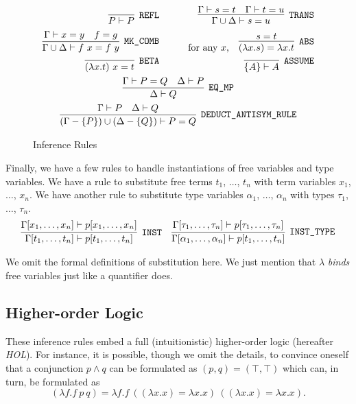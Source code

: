 \begin{figure}
  \begin{gather*}
    \begin{aligned}
      \infer[\code{REFL}]{P\vdash P}{} &\qquad&
      \infer[\code{TRANS}]{\Gamma\cup\Delta\vdash s=u}{\Gamma\vdash s=t&\Gamma\vdash t=u}\\
      \infer[\code{MK\_COMB}]{\Gamma\cup\Delta\vdash f\ x=f\ y}{\Gamma\vdash x = y & f = g} &&
      \text{for any $x$,}\quad \infer[\code{ABS}]{(\lambda x. s) = \lambda x. t}{s = t}\\
      \infer[\code{BETA}]{(\lambda x. t)\ x = t}{}&&
      \infer[\code{ASSUME}]{\{A\} \vdash A}{}
    \end{aligned}\\
    \infer[\code{EQ\_MP}]{\Delta\vdash Q}{\Gamma\vdash P = Q & \Delta\vdash P}\\
    \infer[\code{DEDUCT\_ANTISYM\_RULE}]{(\Gamma - \{P\})\cup(\Delta - \{Q\})\vdash P = Q}{\Gamma\vdash P & \Delta\vdash Q}\\
  \end{gather*}
  \caption{Inference Rules}
  \label{fig:HOLInferenceRules}
\end{figure}

Finally, we have a few rules to handle instantiations of free variables and type variables. We have a rule to substitute free terms $t_1$, $\ldots$, $t_n$ with term variables $x_1$, $\ldots$, $x_n$. We have another rule to substitute type variables $\alpha_1$, $\ldots$, $\alpha_n$ with types $\tau_1$, $\ldots$, $\tau_n$.
\begin{align*}
  \infer[\code{INST}]{\Gamma[t_1,\ldots,t_n]
    \vdash p[t_1,\ldots,t_n]}
  {\Gamma[x_1,\ldots,x_n]\vdash p[x_1,\ldots,x_n]}&&
  \infer[\code{INST\_TYPE}]{\Gamma[\alpha_1,\ldots,\alpha_n]
    \vdash p[t_1,\ldots,t_n]}
  {\Gamma[\tau_1,\ldots,\tau_n]\vdash p[\tau_1,\ldots,\tau_n]}
\end{align*}

We omit the formal definitions of substitution here. We just mention that $\lambda$ \emph{binds} free variables just like a quantifier does.

\subsection{Higher-order Logic}
These inference rules embed a full (intuitionistic) higher-order logic (hereafter \emph{HOL}). For instance, it is possible, though we omit the details, to convince oneself that a conjunction $p \wedge q$ can be formulated as $(p,q) = (\top,\top)$ which can, in turn, be formulated as
\begin{displaymath}
(\lambda f. f\ p\ q) = \lambda f. f\ ((\lambda x. x) = \lambda x. x)\ ((\lambda x. x) = \lambda x. x).
\end{displaymath}

